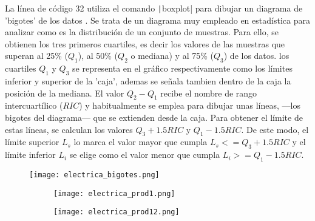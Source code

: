\begin{paracol}{2}
La línea de código 32 utiliza el comando \texttt|boxplot| para dibujar un diagrama de 'bigotes' de los datos . Se trata de un diagrama muy empleado en estadística para analizar como es la distribución de un conjunto de muestras. Para ello, se obtienen los tres primeros cuartiles, es decir los valores de las muestras que superan al 25\% ($Q_1$), al 50\% ($Q_2$ o mediana) y al 75\% ($Q_3$) de los datos. los cuartiles $Q_1$ y $Q_3$ se representa en el gráfico respectivamente como los límites inferior y superior de la 'caja', ademas se señala tambien dentro de la caja la posición de la mediana. El valor $Q_2-Q_1$ recibe el nombre de rango intercuartílico ($RIC$) y habitualmente se emplea para dibujar unas líneas, ---los bigotes del diagrama--- que se extienden desde la caja. Para obtener el límite de estas líneas, se calculan los valores $Q_3+1.5RIC$ y $Q_1-1.5RIC$. De este modo, el límite superior $L_s$ lo marca el valor mayor que cumpla $L_s <= Q_3+1.5RIC$ y el límite inferior $L_i$ se elige como el valor menor que cumpla $L_i >= Q_1-1.5RIC$.
\end{paracol}
\begin{figure}
	\centering
	\texttt{[image: electrica\_bigotes.png]}
	\label{fig:datab}
\end{figure}

\begin{figure}
	\begin{subfigure}{\textwidth}
		\centering
		\texttt{[image: electrica\_prod1.png]}
		\label{fig:data01}
	\end{subfigure}
	\begin{subfigure}{\textwidth}
		\centering
		\texttt{[image: electrica\_prod12.png]}
		\label{fig:data12}
	\end{subfigure}
\end{figure}

